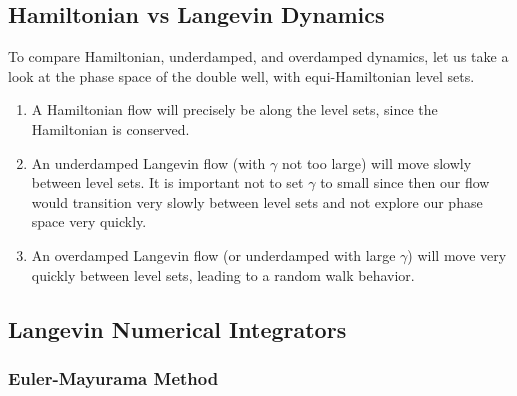 \documentclass{article}
\begin{document}
  \subsection{Hamiltonian vs Langevin Dynamics}

    To compare Hamiltonian, underdamped, and overdamped dynamics, let us take a look at the phase space of the double well, with equi-Hamiltonian level sets. 
    \begin{enumerate}
      \item A Hamiltonian flow will precisely be along the level sets, since the Hamiltonian is conserved. 
      \item An underdamped Langevin flow (with $\gamma$ not too large) will move slowly between level sets. It is important not to set $\gamma$ to small since then our flow would transition very slowly between level sets and not explore our phase space very quickly. 
      \item An overdamped Langevin flow (or underdamped with large $\gamma$) will move very quickly between level sets, leading to a random walk behavior. 
    \end{enumerate}
    \begin{center}
    \end{center}

  \subsection{Langevin Numerical Integrators}

    \subsubsection{Euler-Mayurama Method}
\end{document}
